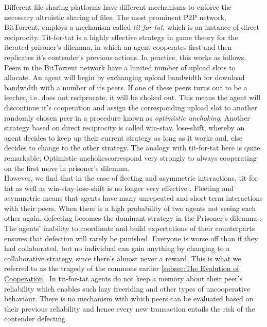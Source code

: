 \documentclass[11pt,a4paper]{article}
\theoremstyle{definition}
\theoremstyle{theorem}
\theoremstyle{proposition}
\theoremstyle{corollary}
\theoremstyle{lemma}
\theoremstyle{example}
\theoremstyle{remark}
\begin{document}
\noindent{}Different file sharing platforms have different mechanisms to enforce the necessary altruistic sharing of files. The most prominent P2P network, BitTorrent, employs a mechanism called {\it tit-for-tat}, which is an instance of direct reciprocity. Tit-for-tat is a highly effective strategy in game theory for the iterated prisoner's dilemma, in which an agent cooperates first and then replicates it's contender's previous actions. In practice, this works as follows. Peers in the BitTorrent network have a limited number of upload slots to allocate. An agent will begin by exchanging upload bandwidth for download bandwidth with a number of its peers. If one of these peers turns out to be a leecher, i.e. does not reciprocate, it will be choked out. This means the agent will discontinue it's cooperation and assign the corresponding upload slot to another randomly chosen peer in a procedure known as {\it optimistic unchoking}. Another strategy based on direct reciprocity is called win-stay, lose-shift, whereby an agent decides to keep up their current strategy as long as it works and, else decides to change to the other strategy. The analogy with tit-for-tat here is quite remarkable; Optimistic unchokescorrespond very strongly to always cooperating on the first move in prisoner’s dilemma. \cite{Incentives build robustness in BitTorrent} \vspace{1em}\\

\noindent{}However, we find that in the case of fleeting and asymmetric interactions, tit-for-tat as well as win-stay-lose-shift is no longer very effective \cite{A Simple Rule for the Evolution of Cooperation on Graphs and Social Networks}. Fleeting and asymmetric means that agents have many unrepeated and short-term interactions with their peers. When there is a high probability of two agents not seeing each other again, defecting becomes the dominant strategy in the Prisoner's dilemma \cite{An optimal strategy to solve the prisoner's dilemma}. The agents' inability to coordinate and build expectations of their counterparts ensures that defection will rarely be punished. Everyone is worse off than if they had collaborated, but no individual can gain anything by changing to a collaborative strategy, since there's almost never a reward. This is what we referred to as the tragedy of the commons earlier \ref{subsec:The Evolution of Cooperation}. In tit-for-tat agents do not keep a memory about their peer’s reliability which enables such lazy freeriding and other types of uncooperative behaviour. There is no mechanism with which peers can be evaluated based on their previous reliability and hence every new transaction entails the risk of the contender defecting. \vspace{1em}\\
\end{document}
